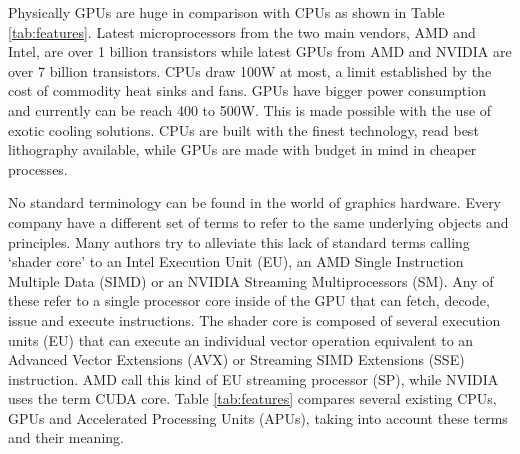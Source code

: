 \documentclass[review]{elsarticle}
\begin{document}


Physically GPUs are huge in comparison with CPUs as shown in Table \ref{tab:features}. Latest microprocessors from the two main vendors, AMD and Intel, are over 1 billion transistors while latest GPUs from AMD and NVIDIA \cite{nvidia} are over 7 billion transistors. CPUs draw 100W at most, a limit established by the cost of commodity heat sinks and fans. GPUs have bigger power consumption and currently can be reach 400 to 500W. This is made possible with the use of exotic cooling solutions. CPUs are built with the finest technology, read best lithography available, while GPUs are made with budget in mind in cheaper processes.

No standard terminology can be found in the world of graphics hardware.
Every company have a  different set of terms to refer to the same
underlying objects and principles. Many authors try to alleviate this
lack of standard terms calling `shader core' to an Intel Execution
Unit (EU), an AMD Single Instruction Multiple Data (SIMD) or an NVIDIA
Streaming Multiprocessors (SM). Any of these refer to a single
processor core inside of the GPU that can fetch, decode, issue and
execute instructions. The shader core is composed of several
execution units (EU) that can execute an individual vector operation
equivalent to an Advanced Vector Extensions (AVX) or Streaming SIMD
Extensions (SSE) instruction. AMD call this kind of EU streaming
processor (SP), while NVIDIA uses the term CUDA core. Table
\ref{tab:features} compares several existing CPUs, GPUs and
Accelerated Processing Units (APUs), taking into account these terms
and their meaning.
\end{document}
